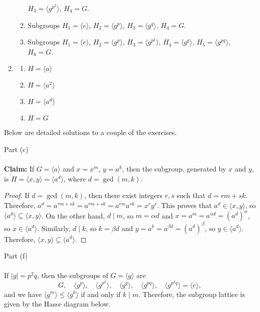 \documentclass[12pt]{article}
\newcommand{\order}[1]{\ensuremath{|#1|}}
\newcommand{\divides}{\ensuremath{\mid}}
\newcommand{\<}{\ensuremath{\langle}}
\renewcommand{\>}{\ensuremath{\rangle}}
\theoremstyle{plain}
\theoremstyle{definition}
\begin{document}
\begin{enumerate}
\begin{enumerate}
$H_3=\langle g^{p^2}\rangle$, $H_4=G$.
\item Subgroups $H_1=\langle e\rangle$, $H_2=\langle g^p\rangle$,
$H_3=\langle g^{q}\rangle$, $H_4=G$.
\item Subgroups 
$H_1=\langle e\rangle$, $H_2=\langle g^p\rangle$,
$H_3=\langle g^{p^2}\rangle$, $H_4=\langle g^q\rangle$, 
$H_5=\langle g^{pq}\rangle$,  $H_6=G$.
\end{enumerate}
\item \label{item:1}
\begin{enumerate}
\item $H=\langle a\rangle$
\item $H=\langle a^2\rangle$
\item $H=\langle a^d\rangle$
\item $H=G$
\end{enumerate}
\end{enumerate}

\newpage

\pagestyle{fancy} \lhead{\bf } 
\rhead{} \lfoot{} \cfoot{\thepage} \rfoot{}

\noindent Below are detailed solutions to a couple of the exercises.

\medskip

 Part (c)\\
\\
{\bf Claim:}
If $G = \<a\>$ and $x = x^m$, $y = a^k$, then the subgroup, 
generated by $x$ and $y$, is 
$H = \<x, y\> = \<a^d\>$, where $d = \gcd(m, k)$.
\begin{proof}
If $d = \gcd(m, k)$, then there exist integers $r, s$ such that 
$d = rm + sk$.  Therefore, 
$a^d = a^{rm + sk} = a^{rm + sk} = a^{rm}a^{sk} =  x^ry^s$. This proves that
$a^d \in \<x, y\>$, so 
$\<a^d\> \subseteq \<x, y\>$. On the other hand, 
$d\divides m$, so
$m = \alpha d$ and $x = a^m = a^{\alpha d} = (a^d)^\alpha$, so 
$x\in \<a^d\>$.  
Similarly, $d\divides k$, so $k = \beta d$ 
and $y = a^k = a^{\beta d} = (a^d)^\beta$, so
$y\in \<a^d\>$.  Therefore, $\<x, y\> \subseteq \<a^d\>$.
\end{proof}

\bigskip

 Part (f)\\
\\
If $\order{g}=p^2q$, then the subgroups of $G= \<g\>$ are
\[
G, \quad
\<g^p\>, \quad 
\<g^{p^2}\>, \quad 
\<g^q\>, \quad 
\<g^{pq}\>, \quad 
\<g^{p^2q}\> = \<e\>,
\]
and we have 
$\<g^m\> \leq \< g^k\>$ if and only if $k\divides m$.  Therefore, the subgroup
lattice is given by the Hasse diagram below.
\end{document}
